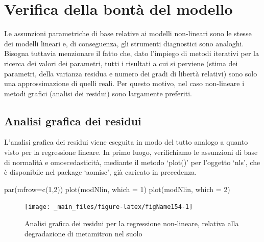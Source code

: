 \documentclass[a4paper,12pt,oneside]{book}
\newenvironment{Shaded}{}{}
\newcommand{\KeywordTok}[1]{#1}
\newcommand{\DataTypeTok}[1]{#1}
\newcommand{\DecValTok}[1]{#1}
\newcommand{\NormalTok}[1]{#1}
\begin{document}
\hypertarget{verifica-della-bonta-del-modello}{%
\section{Verifica della bontà del modello}\label{verifica-della-bonta-del-modello}}

Le assunzioni parametriche di base relative ai modelli non-lineari sono le stesse dei modelli lineari e, di conseguenza, gli strumenti diagnostici sono analoghi. Bisogna tuttavia menzionare il fatto che, dato l'impiego di metodi iterativi per la ricerca dei valori dei parametri, tutti i risultati a cui si perviene (stima dei parametri, della varianza residua e numero dei gradi di libertà relativi) sono solo una approssimazione di quelli reali. Per questo motivo, nel caso non-lineare i metodi grafici (analisi dei residui) sono largamente preferiti.

\hypertarget{analisi-grafica-dei-residui-1}{%
\subsection{Analisi grafica dei residui}\label{analisi-grafica-dei-residui-1}}

L'analisi grafica dei residui viene eseguita in modo del tutto analogo a quanto visto per la regressione lineare. In primo luogo, verifichiamo le assunzioni di base di normalità e omoscedasticità, mediante il metodo `plot()' per l'oggetto `nls', che è disponibile nel package `aomisc', già caricato in precedenza.

\begin{Shaded}
\begin{Highlighting}[]
\KeywordTok{par}\NormalTok{(}\DataTypeTok{mfrow=}\KeywordTok{c}\NormalTok{(}\DecValTok{1}\NormalTok{,}\DecValTok{2}\NormalTok{))}
\KeywordTok{plot}\NormalTok{(modNlin, }\DataTypeTok{which =} \DecValTok{1}\NormalTok{)}
\KeywordTok{plot}\NormalTok{(modNlin, }\DataTypeTok{which =} \DecValTok{2}\NormalTok{)}
\end{Highlighting}
\end{Shaded}

\begin{figure}

{\centering \texttt{[image: \_main\_files/figure-latex/figName154-1]} 

}

\caption{Analisi grafica dei residui per la regressione non-lineare, relativa alla degradazione di metamitron nel suolo}\label{fig:figName154}
\end{figure}
\end{document}
